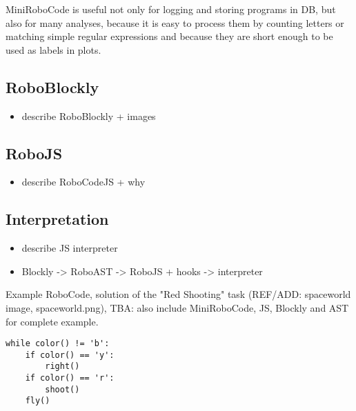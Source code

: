 MiniRoboCode is useful not only for logging and storing programs in DB,
but also for many analyses,
because it is easy to process them by counting letters or matching simple regular expressions
and because they are short enough to be used as labels in plots.


\subsection{RoboBlockly}

\begin{itemize}
\item describe RoboBlockly + images
\end{itemize}


\subsection{RoboJS}

\begin{itemize}
\item describe RoboCodeJS + why
\end{itemize}

\subsection{Interpretation}

\begin{itemize}
\item describe JS interpreter
\item Blockly -> RoboAST -> RoboJS + hooks -> interpreter
\end{itemize}


Example RoboCode, solution of the "Red Shooting" task (REF/ADD: spaceworld image, spaceworld.png), TBA: also include MiniRoboCode, JS, Blockly and AST for complete example.

\begin{lstlisting}
while color() != 'b':
    if color() == 'y':
        right()
    if color() == 'r':
        shoot()
    fly()
\end{lstlisting}
